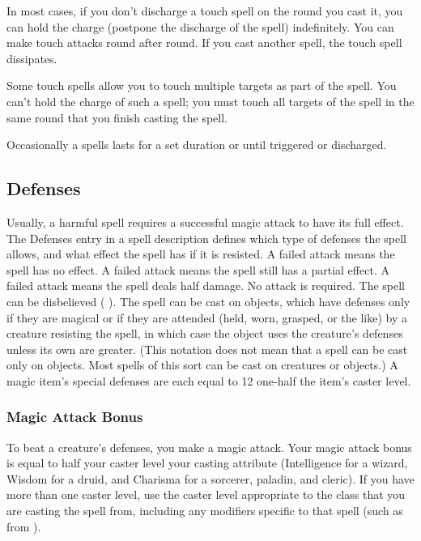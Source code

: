  In most cases, if you don't discharge a touch spell on the round you cast it, you can hold the charge (postpone the discharge of the spell) indefinitely. You can make touch attacks round after round. If you cast another spell, the touch spell dissipates.

Some touch spells allow you to touch multiple targets as part of the spell. You can't hold the charge of such a spell; you must touch all targets of the spell in the same round that you finish casting the spell.

 Occasionally a spells lasts for a set duration or until triggered or discharged.

\subsection{Defenses}\label{Magic Defenses}
Usually, a harmful spell requires a successful magic attack to have its full effect. The Defenses entry in a spell description defines which type of defenses the spell allows, and what effect the spell has if it is resisted.
 A failed attack means the spell has no effect.
 A failed attack means the spell still has a partial effect.
 A failed attack means the spell deals half damage.
 No attack is required.
 The spell can be disbelieved ( ).
 The spell can be cast on objects, which have defenses only if they are magical or if they are attended (held, worn, grasped, or the like) by a creature resisting the spell, in which case the object uses the creature's defenses unless its own are greater. (This notation does not mean that a spell can be cast only on objects. Most spells of this sort can be cast on creatures or objects.) A magic item's special defenses are each equal to 12 \add one-half the item's caster level.

\subsubsection{Magic Attack Bonus}\label{Magic Attack Bonus}
To beat a creature's defenses, you make a magic attack. Your magic attack bonus is equal to half your caster level \add your casting attribute (Intelligence for a wizard, Wisdom for a druid, and Charisma for a sorcerer, paladin, and cleric). If you have more than one caster level, use the caster level appropriate to the class that you are casting the spell from, including any modifiers specific to that spell (such as from ).

